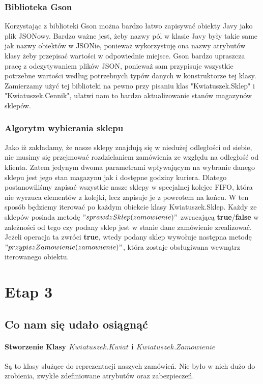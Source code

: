 \documentclass{article}
\begin{document}
        \subsubsection{Biblioteka Gson}
        Korzystając z biblioteki Gson można bardzo łatwo zapisywać obiekty Javy jako plik JSONowy. Bardzo ważne jest, żeby nazwy pól w klasie Javy były takie same jak nazwy obiektów w JSONie, ponieważ wykorzystuję ona nazwy atrybutów klasy żeby przepisać wartości w odpowiednie miejsce. Gson bardzo upraszcza pracę z odczytywaniem plików JSON, ponieważ sam przypisuje wszystkie potrzebne wartości według potrzebnych typów danych w konstruktorze tej klasy. Zamierzamy użyć tej biblioteki na pewno przy pisaniu klas "Kwiatuszek.Sklep" i "Kwiatuszek.Cennik", ułatwi nam to bardzo aktualizowanie stanów magazynów sklepów.
        
        \subsubsection{Algorytm wybierania sklepu}
        Jako iż zakładamy, że nasze sklepy znajdują się w niedużej odległości od siebie, nie musimy się przejmować rozdzielaniem zamówienia ze względu na odległość od klienta. Zatem jedynym dwoma parametrami wpływającym na wybranie danego sklepu jest jego stan magazynu jak i dostępne godziny kuriera. Dlatego postanowiliśmy zapisać wszystkie nasze sklepy w specjalnej kolejce FIFO, która nie wyrzuca elementów z kolejki, lecz zapisuje je z powrotem na końcu. W ten sposób będziemy iterować po każdym obiekcie klasy Kwiatuszek.Sklep. Każdy ze sklepów posiada metodę $"sprawdzSklep(zamowienie)"$ zwracającą \textbf{true}/\textbf{false} w zależności od tego czy podany sklep jest w stanie dane zamówienie zrealizować. Jeżeli operacja ta zwróci \textbf{true}, wtedy podany sklep wywołuje następna metodę $"przypiszZamowienie(zamowienie)"$, która zostaje obsługiwana wewnątrz iterowanego obiektu.
        
        
    \section{Etap 3}
        \subsection{Co nam się udało osiągnąć}
        
        \paragraph{Stworzenie Klasy $Kwiatuszek.Kwiat$ i $Kwiatuszek.Zamowienie$} Są to klasy służące do reprezentacji naszych zamówień. Nie było w nich dużo do zrobienia, zwykłe zdefiniowane atrybutów oraz zabezpieczeń.
\end{document}
